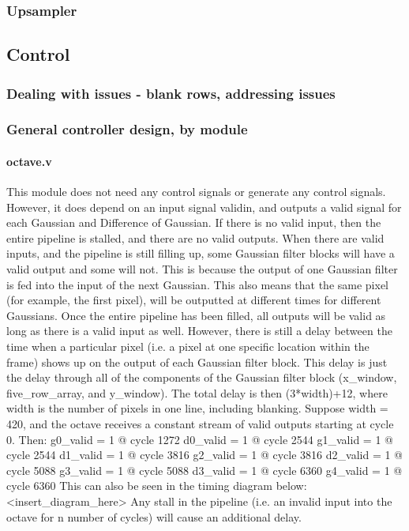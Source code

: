 \documentclass[12pt]{article}
\begin{document}
\subsubsection{Upsampler}



\subsection{Control}

\subsubsection{Dealing with issues - blank rows, addressing issues}

\subsubsection{General controller design, by module}

\paragraph{octave.v}
This module does not need any control signals or generate any control signals. 
However, it does depend on an input signal validin, and outputs a valid signal 
for each Gaussian and Difference of Gaussian. If there is no valid input, then 
the entire pipeline is stalled, and there are no valid outputs. When there are 
valid inputs, and the pipeline is still filling up, some Gaussian filter blocks 
will have a valid output and some will not. This is because the output of one 
Gaussian filter is fed into the input of the next Gaussian. This also means that 
the same pixel (for example, the first pixel), will be outputted at different 
times for different Gaussians. Once the entire pipeline has been filled, all 
outputs will be valid as long as there is a valid input as well. However, there 
is still a delay between the time when a particular pixel (i.e. a pixel at one 
specific location within the frame) shows up on the output of each Gaussian 
filter block. This delay is just the delay through all of the components of the 
Gaussian filter block (x\_window, five\_row\_array, and y\_window). The total delay 
is then (3*width)+12, where width is the number of pixels in one line, including 
blanking. Suppose width = 420, and the octave receives a constant stream of 
valid outputs starting at cycle 0. Then:
g0\_valid = 1 @ cycle 1272
d0\_valid = 1 @ cycle 2544
g1\_valid = 1 @ cycle 2544
d1\_valid = 1 @ cycle 3816
g2\_valid = 1 @ cycle 3816
d2\_valid = 1 @ cycle 5088
g3\_valid = 1 @ cycle 5088
d3\_valid = 1 @ cycle 6360
g4\_valid = 1 @ cycle 6360
This can also be seen in the timing diagram below: <insert\_diagram\_here>
Any stall in the pipeline (i.e. an invalid input into the octave for n number of 
cycles) will cause an additional delay.
\end{document}
